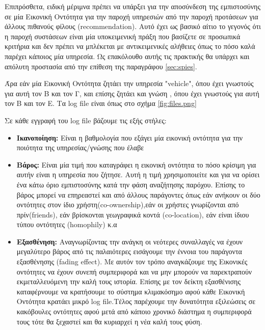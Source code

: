 Επιπρόσθετα, ειδική μέριμνα πρέπει να υπάρξει για την αποσύνδεση της εμπιστοσύνης σε μία Εικονική Οντότητα για την παροχή υπηρεσιών από την παροχή προτάσεων για άλλους πιθανούς φίλους (recommendation). Αυτό έχει ως βασικό αίτιο το γεγονός ότι η παροχή συστάσεων είναι μία υποκειμενική πράξη που βασίζετε σε προσωπικά κριτήρια και δεν πρέπει να μπλέκεται με αντικειμενικές αλήθειες όπως το πόσο καλά παρέχει κάποιος μία υπηρεσία. Ως επακόλουθο αυτής τις πρακτικής θα υπάρχει και απόλυτη προστασία από την επίθεση της παραγράφου \ref{sec:spies}.

Άρα εάν μία Εικονική Οντότητα ζητάει την υπηρεσία "vehicle", όπου έχει γνωστούς για αυτή τον Β και τον Γ, και επίσης ζητάει και γνώση , όπου έχει γνωστούς για αυτή τον Β και τον Ε. Τα log file είναι όπως στο σχήμα \ref{fig:files.png}
\newpage
{}


Σε κάθε εγγραφή του log file βάζουμε τις εξής στήλες:
\begin{itemize}

\item \textbf{Ικανοποίηση:} Είναι η βαθμολογία που εξάγει μία εικονική οντότητα για την ποιότητα της υπηρεσίας/γνώσης που έλαβε

\item \textbf{Βάρος:} Είναι μία τιμή που καταγράφει η εικονική οντότητα το πόσο κρίσιμη για αυτήν είναι η υπηρεσία που ζήτησε. Αυτή η τιμή χρησιμοποιείτε και για να ορίσει ένα κάτω όριο εμπιστοσύνης κατά την φάση αναζήτησης παρόχου. Επίσης το βάρος μπορεί να επηρεαστεί και από άλλους παράγοντες όπως εάν ανήκουν οι δύο οντότητες στον ίδιο χρήστη(co-ownership),εάν οι χρήστες γνωρίζονται από πρίν(friends), εάν βρίσκονται γεωγραφικά κοντά (co-location), εάν είναι ίδιου τύπου οντότητες (homophily) κ.α

\item \textbf{Εξασθένηση:} Αναγνωρίζοντας την ανάγκη οι νεότερες συναλλαγές να έχουν μεγαλύτερο βάρος από τις παλαιότερες εισάγουμε την έννοια του παράγοντα εξασθένησης (fading effect). Με αυτόν τον τρόπο αναγκάζουμε της Εικονικές οντότητες να έχουν συνεπή συμπεριφορά και να μην μπορούν να παρεκτραπούν εκμεταλλευόμενη την καλή τους ιστορία. Επίσης με τον δείκτη εξασθένισης καταφέρνουμε να κρατήσουμε το σύστημα κλιμακόσημο αφού κάθε Εικονική Οντότητα κρατάει μικρό log file.Τέλος παρέχουμε την δυνατότητα εξιλεώσεις σε κακόβουλες οντότητες αφού μετά από κάποιο χρονικό διάστημα η συμπεριφορά τους τότε θα ξεχαστεί και θα κυριαρχεί η νέα καλή τους φύση.

\end{itemize}

